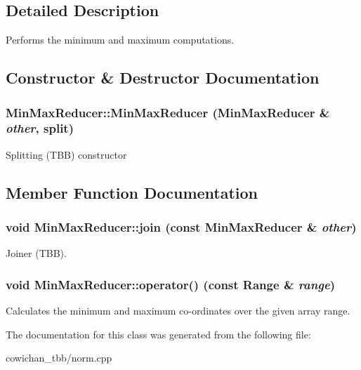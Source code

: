 \subsection{Detailed Description}
Performs the minimum and maximum computations. 

\subsection{Constructor \& Destructor Documentation}
\hypertarget{class_min_max_reducer_282eda515485b150389c963f1024ce12}{
\subsubsection[{MinMaxReducer}]{\setlength{\rightskip}{0pt plus 5cm}MinMaxReducer::MinMaxReducer ({\bf MinMaxReducer} \& {\em other}, \/  split)}}
\label{class_min_max_reducer_282eda515485b150389c963f1024ce12}


Splitting (TBB) constructor 

\subsection{Member Function Documentation}
\hypertarget{class_min_max_reducer_d002be90fb5c5e273b9f0d5fcb1db988}{
\subsubsection[{join}]{\setlength{\rightskip}{0pt plus 5cm}void MinMaxReducer::join (const {\bf MinMaxReducer} \& {\em other})}}
\label{class_min_max_reducer_d002be90fb5c5e273b9f0d5fcb1db988}


Joiner (TBB). \hypertarget{class_min_max_reducer_966e6358c637bb3c663a3b6547170fd4}{
\subsubsection[{operator()}]{\setlength{\rightskip}{0pt plus 5cm}void MinMaxReducer::operator() (const {\bf Range} \& {\em range})}}
\label{class_min_max_reducer_966e6358c637bb3c663a3b6547170fd4}


Calculates the minimum and maximum co-ordinates over the given array range. 

The documentation for this class was generated from the following file:\begin{CompactItemize}
\item 
cowichan\_\-tbb/norm.cpp\end{CompactItemize}
